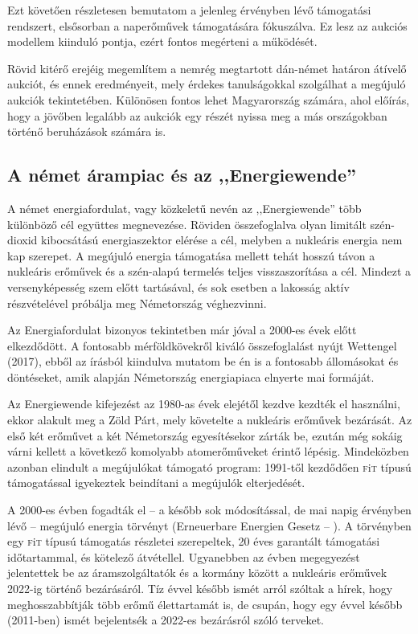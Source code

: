 \documentclass[twoside, magyar, showtrims]{corvinusphd}
\newcommand{\fit}{\textsc{f}i\textsc{t}\index{\textsc{f}i\textsc{t}} }
\begin{document}
Ezt követően részletesen bemutatom a jelenleg
érvényben lévő támogatási rendszert,
elsősorban a naperőművek támogatására fókuszálva.
Ez lesz az aukciós modellem kiinduló pontja,
ezért fontos megérteni a működését.

Rövid kitérő erejéig megemlítem a nemrég megtartott
dán-német határon átívelő aukciót, és ennek eredményeit,
mely érdekes tanulságokkal szolgálhat
a megújuló aukciók tekintetében. Különösen
fontos lehet Magyarország számára, 
ahol előírás, hogy a jövőben legalább 
az aukciók egy részét nyissa meg a más
országokban történő beruházások számára is.

\subsection{A német árampiac és az ,,Energiewende''}

A német energiafordulat, vagy közkeletű nevén az ,,Energiewende''
több különböző cél együttes megnevezése.
Röviden összefoglalva olyan limitált szén-dioxid kibocsátású
energiaszektor elérése a cél, melyben a nukleáris energia nem kap szerepet.
A megújuló energia támogatása mellett tehát hosszú távon
a nukleáris erőművek és a szén-alapú termelés teljes visszaszorítása a cél.
Mindezt a versenyképesség szem előtt tartásával, és sok esetben
a lakosság aktív részvételével próbálja meg Németország véghezvinni.

Az Energiafordulat bizonyos tekintetben
már jóval a 2000-es évek előtt elkezdődött.
A fontosabb mérföldkövekről kiváló összefoglalást nyújt
Wettengel (2017), ebből az írásból kiindulva mutatom be én is a fontosabb
állomásokat és döntéseket, amik alapján Németország energiapiaca
elnyerte mai formáját.

Az Energiewende kifejezést az 1980-as évek elejétől
kezdve kezdték el használni,
ekkor alakult meg a Zöld Párt, mely követelte
a nukleáris erőművek bezárását.
Az első két erőművet a két Németország
egyesítésekor zárták be,
ezután még sokáig várni kellett a következő
komolyabb atomerőműveket érintő lépésig.
Mindeközben azonban elindult a megújulókat támogató program:
1991-től kezdődően \fit típusú támogatással igyekeztek
beindítani a megújulók elterjedését.

A 2000-es évben fogadták el -- a később sok
módosítással, de mai napig érvényben lévő -- 
megújuló energia törvényt (Erneuerbare Energien Gesetz -- ).
A törvényben egy \fit típusú támogatás részletei
szerepeltek, 20 éves garantált támogatási
időtartammal, és kötelező átvétellel.
Ugyanebben az évben megegyezést jelentettek
be az áramszolgáltatók és a kormány között
a nukleáris erőművek 2022-ig történő bezárásáról.
Tíz évvel később ismét arról szóltak a hírek,
hogy meghosszabbítják több erőmű élettartamát
is, de csupán, hogy  egy évvel később (2011-ben)
ismét bejelentsék a 2022-es bezárásról szóló terveket.
\end{document}
